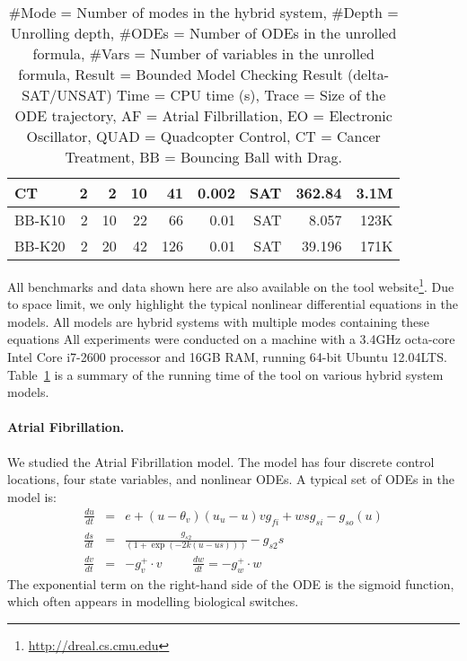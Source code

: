 {\begin{table}[!th]
\begin{tabular}{l|r|r|r|r|r|r|r|r}
    CT       & 2   & 2         & 10      & 41      & 0.002     & SAT & 362.84 & 3.1M\\
    \hline
    \hline
    BB-K10 & 2     & 10       & 22     & 66      & 0.01        & SAT & 8.057     & 123K  \\
    BB-K20 & 2     & 20       & 42     & 126     & 0.01        & SAT & 39.196    & 171K  \\
    \hline
    \hline
  \end{tabular}
  \caption{\small
    \#Mode = Number of modes in the hybrid system,
    \#Depth = Unrolling depth,
    \#ODEs = Number of ODEs in the unrolled formula,
    \#Vars = Number of variables in the unrolled formula,
    Result = Bounded Model Checking Result (delta-SAT/UNSAT)
    Time = CPU time (s),
    Trace = Size of the ODE trajectory,
    AF = Atrial Filbrillation,
    EO = Electronic Oscillator,
    QUAD = Quadcopter Control,
    CT = Cancer Treatment,
    BB = Bouncing Ball with Drag.
}\label{tbl:exp}
\end{table}


All benchmarks and data shown here are also available on the tool
website\footnote{\url{http://dreal.cs.cmu.edu}}. Due to space limit,
we only highlight the typical nonlinear differential equations in the
models. All models are hybrid systems with multiple modes containing
these equations All experiments were conducted on a machine with a
3.4GHz octa-core Intel Core i7-2600 processor and 16GB RAM, running
64-bit Ubuntu 12.04LTS. Table~\ref{tbl:exp} is a summary of the
running time of the tool on various hybrid system models.

\paragraph{Atrial Fibrillation.} We studied the Atrial Fibrillation model. The model has four discrete control locations, four state variables, and nonlinear ODEs. A typical set of ODEs in the model is:
\begin{eqnarray*}
\frac{du}{dt} &=& e + (u-\theta_v)(u_u-u ) v g_{fi} + wsg_{si}-g_{so}(u)\\
\frac{ds}{dt} &=& \displaystyle\frac{g_{s2}}{(1+\exp(-2k(u-us)))} -  g_{s2}s\\
\frac{dv}{dt} &=& -g_v^+\cdot v \hspace{1cm} \frac{dw}{dt} = -g_w^+\cdot w
\end{eqnarray*}
The exponential term on the right-hand side of the ODE is the sigmoid function, which often appears in modelling biological switches.

}
